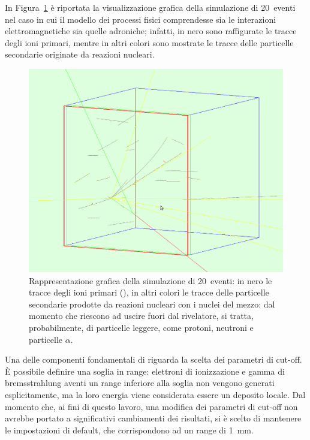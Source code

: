 In Figura~\ref{fig:simulazione_evento} è riportata la visualizzazione grafica della simulazione di 20~eventi nel caso in cui il modello dei processi fisici comprendesse sia le interazioni elettromagnetiche sia quelle adroniche; infatti, in nero sono raffigurate le tracce degli ioni primari, mentre in altri colori sono mostrate le tracce delle particelle secondarie originate da reazioni nucleari. 



\begin{figure} [!p]
	\centering
	\includegraphics[width=\textwidth, keepaspectratio]{Grafici/evento5_ritagliato.png}
	\caption{Rappresentazione grafica della simulazione di 20~eventi: in nero le tracce degli ioni primari (), in altri colori le tracce delle particelle secondarie prodotte da reazioni nucleari con i nuclei del mezzo: dal momento che riescono ad uscire fuori dal rivelatore, si tratta, probabilmente, di particelle leggere, come protoni, neutroni e particelle $\alpha$.} \label{fig:simulazione_evento}
\end{figure}




Una delle componenti fondamentali di \geant{} riguarda la scelta dei parametri di cut-off.
È possibile definire una soglia in range: elettroni di ionizzazione e gamma di bremsstrahlung aventi un range inferiore alla soglia non vengono generati esplicitamente, ma la loro energia viene considerata essere un deposito locale.
Dal momento che, ai fini di questo lavoro, una modifica dei parametri di cut-off non avrebbe portato a significativi cambiamenti dei risultati, si è scelto di mantenere le impostazioni di default, che corrispondono ad un range di 1~mm.



